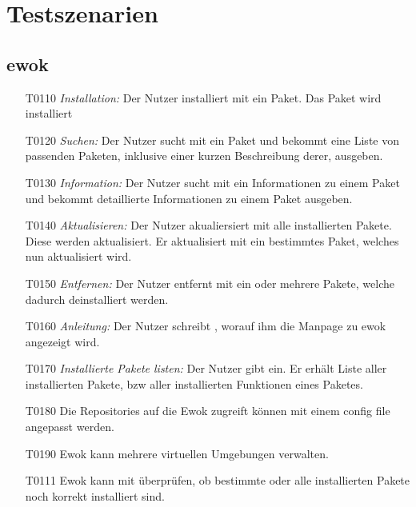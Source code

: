 \chapter{Testszenarien}

\section{ewok}

\begin{itemize}
	\item[T0110] \textit{Installation:} Der Nutzer installiert mit  ein Paket. Das Paket wird installiert
	\item[T0120] \textit{Suchen:} Der Nutzer sucht mit  ein Paket und bekommt eine Liste von passenden Paketen, inklusive einer kurzen Beschreibung derer, ausgeben.
	\item[T0130] \textit{Information:} Der Nutzer sucht mit  ein Informationen zu einem Paket und bekommt detaillierte Informationen zu einem Paket ausgeben.
	\item[T0140] \textit{Aktualisieren:} Der Nutzer akualiersiert mit  alle installierten Pakete. Diese werden aktualisiert. Er aktualisiert mit  ein bestimmtes Paket, welches nun aktualisiert wird.

	\item[T0150] \textit{Entfernen:} Der Nutzer entfernt mit  ein oder mehrere Pakete, welche dadurch deinstalliert werden.
	\item[T0160] \textit{Anleitung:} Der Nutzer schreibt , worauf ihm die Manpage zu ewok angezeigt wird.
	\item[T0170] \textit{Installierte Pakete listen:} Der Nutzer gibt  ein. Er erhält Liste aller installierten Pakete, bzw aller installierten Funktionen eines Paketes.
	\item[T0180] Die Repositories auf die Ewok zugreift können mit einem config file angepasst werden.
	\item[T0190] Ewok kann mehrere virtuellen Umgebungen verwalten. 
	\item[T0111] Ewok kann mit 	 überprüfen, ob bestimmte oder alle installierten Pakete noch korrekt installiert sind.


\end{itemize}


